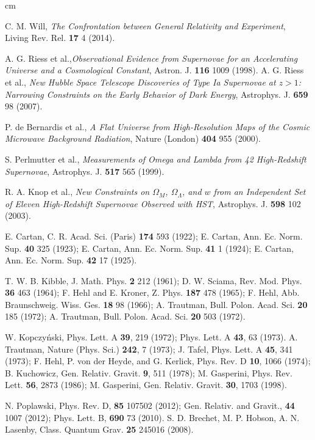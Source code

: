 \documentclass[aps,showpacs,preprintnumbers,amsmath,amssymb]{revtex4}
\begin{document}
\vspace*{0.2cm}
 \begin{thebibliography}{99}
  cm


 C. M. Will, \textit{The Confrontation between General Relativity and Experiment}, Living Rev. Rel. {\bf17} 4 (2014).

 A. G. Riess et al.,\textit{Observational Evidence from Supernovae for an Accelerating Universe and a Cosmological Constant}, Astron. J. {\bf116}  1009 (1998).
 A. G. Riess et al., \textit{New Hubble Space Telescope Discoveries of Type Ia Supernovae at $z>1$: Narrowing Constraints on the Early Behavior of Dark Energy}, Astrophys. J. {\bf 659}  98 (2007).

 P. de Bernardis et al., \textit{A Flat Universe from High-Resolution Maps of the Cosmic Microwave Background Radiation}, Nature (London) {\bf404} 955  (2000).

 S. Perlmutter et al., \textit{Measurements of Omega and Lambda from 42 High-Redshift Supernovae}, Astrophys. J. {\bf517} 565 (1999).

 R. A. Knop et al., \textit{New Constraints on $\Omega_{M}$, $\Omega_{\Lambda}$, and $w$ from an Independent Set of Eleven High-Redshift Supernovae Observed with HST}, Astrophys. J. {\bf 598} 102 (2003).


 E. Cartan, C. R. Acad. Sci. (Paris) {\bf174} 593 (1922);
E. Cartan, Ann. Ec. Norm. Sup. {\bf40} 325 (1923);
E. Cartan, Ann. Ec. Norm. Sup. {\bf41} 1 (1924);
E. Cartan, Ann. Ec. Norm. Sup. {\bf42} 17 (1925).

 T. W. B. Kibble, J. Math. Phys. {\bf2} 212 (1961);
D. W. Sciama, Rev. Mod. Phys. {\bf36} 463 (1964);
F. Hehl and E. Kroner, Z. Phys. {\bf187} 478 (1965);
F. Hehl, Abb. Braunschweig. Wiss. Ges. {\bf18} 98 (1966);
A. Trautman, Bull. Polon. Acad. Sci. {\bf20} 185 (1972);
A. Trautman, Bull. Polon. Acad. Sci. {\bf20} 503 (1972).

 W. Kopczy\'{n}ski, Phys. Lett. A {\bf39}, 219 (1972); Phys. Lett. A {\bf43}, 63 (1973).
 A. Trautman, Nature (Phys. Sci.) {\bf242}, 7 (1973); J. Tafel, Phys. Lett. A {\bf45}, 341 (1973); F. Hehl, P. von der Heyde, and G. Kerlick, Phys. Rev.
D {\bf10}, 1066 (1974); B. Kuchowicz, Gen. Relativ. Gravit. {\bf9}, 511 (1978); M. Gasperini, Phys. Rev. Lett. {\bf56}, 2873 (1986);
M. Gasperini, Gen. Relativ. Gravit. {\bf30}, 1703 (1998).

 N. Poplawski, Phys. Rev. D, {\bf85} 107502 (2012); Gen. Relativ. and Gravit., {\bf44} 1007 (2012); Phys. Lett. B, {\bf690} 73 (2010).
S. D. Brechet, M. P. Hobson, A. N. Lasenby, Class. Quantum Grav. {\bf25}
245016 (2008).


\end{thebibliography}
\end{document}

